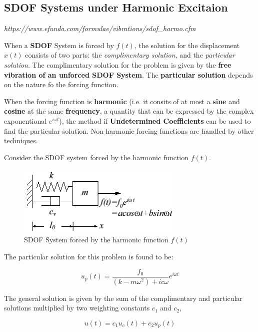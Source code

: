 \documentclass[10pt,b5paper,titlepage]{book}
\begin{document}
\subsection{SDOF Systems under Harmonic Excitaion}
\textit{https://www.efunda.com/formulae/vibrations/sdof\_harmo.cfm}

When a \textbf{SDOF} System is forced by $ f(t) $, the solution for the displacement
$ x(t) $ consists of two parts: the \textit{complimentary solution}, and the
\textit{particular solution}. The complimentary solution for the problem
is given by the \textbf{free vibration of an unforced SDOF System}.
The \textbf{particular solution} depends on the nature fo the forcing function.

When the forcing function is \textbf{harmonic} (i.e. it consits of at most
a \textbf{sine} and \textbf{cosine} at the same \textbf{frequency},
a quantity that can be expressed by the complex exponentional $ e^{i \omega t} $),
the method if \textbf{Undetermined Coefficients} can be used to find the particular
solution. Non-harmonic forcing functions are handled by other techniques.

Consider the SDOF system forced by the harmonic function $ f(t) $.

\begin{figure}[ht]
    \centering
    \includegraphics[width=0.70\textwidth]{img/SDOF_harmonic.png}
    \caption{SDOF System forced by the harmonic function $ f(t) $}
    \label{fig:SDOF-harmonic-response-png}
\end{figure}

The particular solution for this problem is found to be:

\begin{equation}
    u_p(t) = \frac{f_0}{ \left( k - m \omega^2 \right) + i c \omega} e^{i \omega t}
\end{equation}

The general solution is given by the sum of the complimentary and particular
solutions multiplied by two weighting constants $ c_1 $ and $ c_2 $,

\begin{equation}
    u(t) = c_1 u_c(t) + c_2 u_p(t)
\end{equation}
\end{document}
